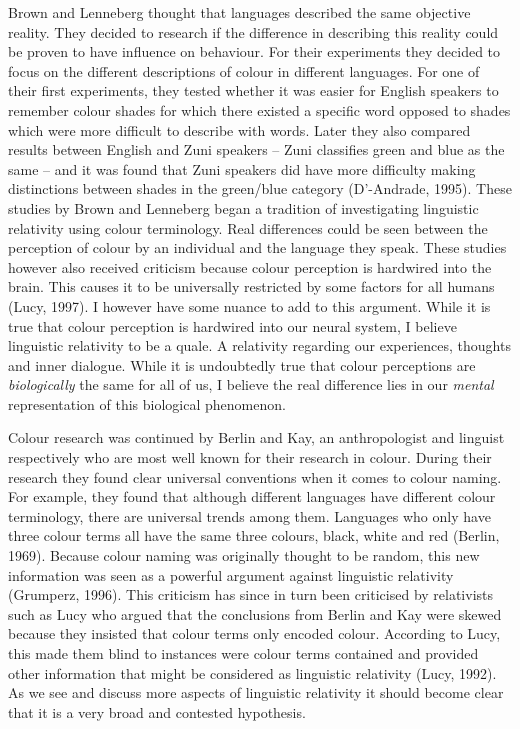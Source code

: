  
Brown and Lenneberg thought that languages described the same objective reality. They decided to research if the difference in describing this reality could be proven to have influence on behaviour. For their experiments they decided to focus on the different descriptions of colour in different languages. For one of their first experiments, they tested whether it was easier for English speakers to remember colour shades for which there existed a specific word opposed to shades which were more difficult to describe with words. Later they also compared results between English and Zuni speakers – Zuni classifies green and blue as the same – and it was found that Zuni speakers did have more difficulty making distinctions between shades in the green/blue category (D’-Andrade, 1995). These studies by Brown and Lenneberg began a tradition of investigating linguistic relativity using colour terminology. Real differences could be seen between the perception of colour by an individual and the language they speak. These studies however also received criticism because colour perception is hardwired into the brain. This causes it to be universally restricted by some factors for all humans (Lucy, 1997). I however have some nuance to add to this argument. While it is true that colour perception is hardwired into our neural system, I believe linguistic relativity to be a quale. A relativity regarding our experiences, thoughts and inner dialogue. While it is undoubtedly true that colour perceptions are \textit{biologically} the same for all of us, I believe the real difference lies in our \textit{mental} representation of this biological phenomenon.  

 
	Colour research was continued by Berlin and Kay, an anthropologist and linguist respectively who are most well known for their research in colour. During their research they found clear universal conventions when it comes to colour naming. For example, they found that although different languages have different colour terminology, there are universal trends among them. Languages who only have three colour terms all have the same three colours, black, white and red (Berlin, 1969). Because colour naming was originally thought to be random, this new information was seen as a powerful argument against linguistic relativity (Grumperz, 1996). This criticism has since in turn been criticised by relativists such as Lucy who argued that the conclusions from Berlin and Kay were skewed because they insisted that colour terms only encoded colour. According to Lucy, this made them blind to instances were colour terms contained and provided other information that might be considered as linguistic relativity (Lucy, 1992). As we see and discuss more aspects of linguistic relativity it should become clear that it is a very broad and contested hypothesis.  

